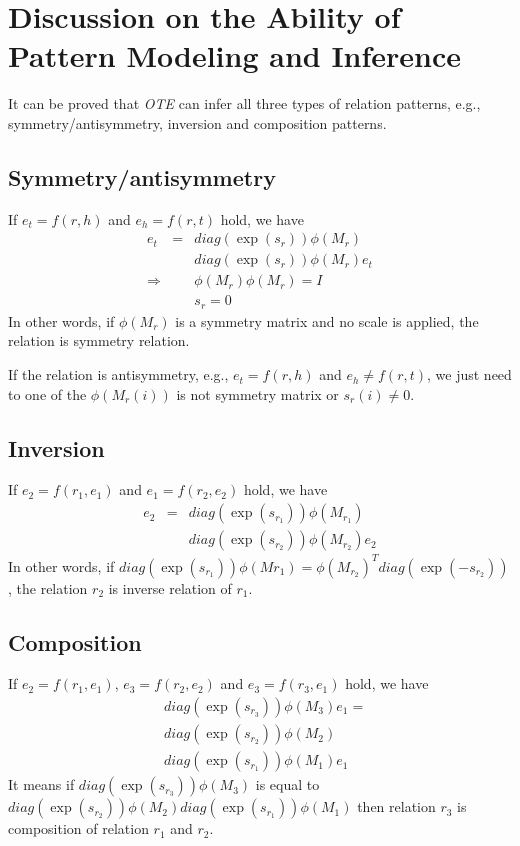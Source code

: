 \documentclass[11pt,a4paper]{article}
\begin{document}
\clearpage
\appendix

\section{Discussion on the Ability of Pattern Modeling and Inference}
\label{sec:appendix}
It can be proved that {\it OTE} can infer all three types of relation patterns, e.g., symmetry/antisymmetry, inversion and composition patterns.
\subsection{Symmetry/antisymmetry} 
If $e_t=f(r,h)$ and $e_h=f(r,t)$ hold, we have
\begin{eqnarray}
    e_t &=& diag(\exp(s_r))\phi(M_r) \nonumber \\
    &&diag(\exp(s_r))\phi(M_{r})  e_t  \nonumber \\
    \Rightarrow&& \phi(M_r)\phi(M_{r}) = I \nonumber \\
    &&  s_r = 0           \nonumber
\end{eqnarray}{}
In other words, if $\phi(M_r)$ is a symmetry matrix and no scale is applied, the relation is symmetry relation.

If the relation is antisymmetry, e.g., $e_t=f(r,h)$ and $e_h \neq f(r,t)$, we just need to one of the $\phi(M_r(i))$ is not symmetry matrix or $s_r(i) \neq 0$.

\subsection{Inversion} 
If $e_2=f(r_1, e_1)$ and $e_1=f(r_2, e_2)$ hold, we have
\begin{eqnarray}
    e_2 &=& diag(\exp(s_{r_1}))\phi(M_{r_1}) \nonumber \\
    && diag(\exp(s_{r_2}))\phi(M_{r_2})e_2 \nonumber
\end{eqnarray}
In other words, if $diag(\exp(s_{r_1}))\phi(M{r_1})=\phi(M_{r_2})^Tdiag(\exp(-s_{r_2}))$, the relation $r_2$ is inverse relation of $r_1$.

\subsection{Composition} 
If $e_2=f(r_1,e_1)$,  $e_3=f(r_2,e_2)$ and $e_3=f(r_3, e_1)$ hold, we  have
\begin{eqnarray}
   & diag(\exp(s_{r_3})) \phi(M_3) e_1= \nonumber \\
   &   diag(\exp(s_{r_2}))\phi(M_2) \nonumber \\
   &  diag(\exp(s_{r_1}))\phi(M_1) e_1  \nonumber
\end{eqnarray}
It means if $diag(\exp(s_{r_3}))\phi(M_3)$ is equal to $diag(\exp(s_{r_2}))\phi(M_2)diag(\exp(s_{r_1}))\phi(M_1)$ then relation $r_3$ is composition of relation $r_1$ and $r_2$.
\end{document}
